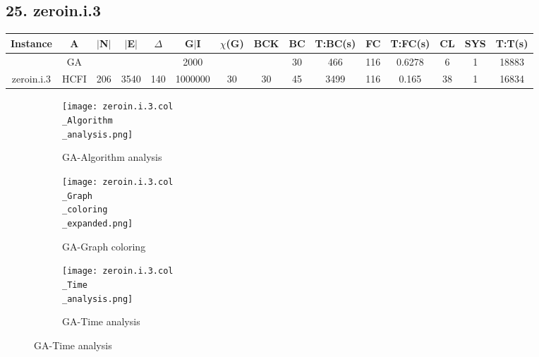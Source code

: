 \documentclass[10pt]{article}
\begin{document}
\subsection*{\hspace{0,9073976cm} 25. zeroin.i.3}
\begin{table}[H]
\centering
\begin{tabular}{|c|c|c|c|c|c|c|c|c|c|c|c|c|c|c|}
\hline
Instance& A &$|$N$|$ & $|$E$|$ & $\Delta$ & G$|$I & $\chi$(G) &BCK&BC & T:BC(s) & FC & T:FC(s) & CL & SYS & T:T(s) \\ \hline \hline

	&GA&       &                   &                     &     2000   &     \cellcolor{yellow} & {\cellcolor{yellow}}& {{\cellcolor{green}30}}
&466   &116        &  0.6278                  &6                    &1          & 18883       \\ \cline{2-2} \cline{6-6} \cline{9-15}
 \multirow{-2}{*}{zeroin.i.3} &HCFI   &\multirow{-2}{*}{206}   &\multirow{-2}{*}{3540}     &\multirow{-2}{*}{140}     &1000000     &\multirow{-2}{*}{\cellcolor{yellow}30}      & \multirow{-2}{*}{\cellcolor{yellow}30}    &{\cellcolor{green}45}     &3499         &116    &0.165         &38    &1     &16834         \\ \hline 
\end{tabular}
\end{table}
\graphicspath{{./Core1/Solutions/GA/zeroin.i.3.col}}
\begin{figure}[H]
\begin{subfigure}{.33\textwidth}
  \centering
  \texttt{[image: zeroin.i.3.col\\\_Algorithm\\\_analysis.png]}
  \caption{GA-Algorithm analysis}
   \label{fig:subfig1}
\end{subfigure}%
\begin{subfigure}{.33\textwidth}
  \centering
  \texttt{[image: zeroin.i.3.col\\\_Graph\\\_coloring\\\_expanded.png]}
  \caption{GA-Graph coloring}
  \label{fig:subfig2}
\end{subfigure}
\begin{subfigure}{.33\textwidth}
  \centering
  \texttt{[image: zeroin.i.3.col\\\_Time\\\_analysis.png]}
  \caption{GA-Time analysis}
  \end{subfigure}
\end{figure}
\end{document}
